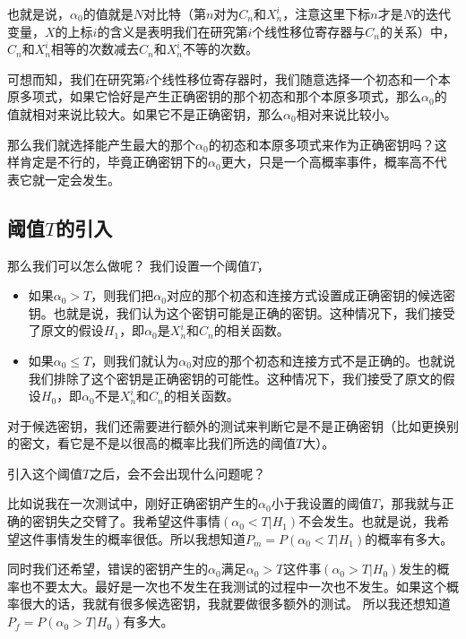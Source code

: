 \documentclass{article}
\begin{document}
也就是说，$\alpha_0$的值就是$N$对比特（第$n$对为$C_n$和$X_n^i$，注意这里下标$n$才是$N$的迭代变量，$X$的上标$i$的含义是表明我们在研究第$i$个线性移位寄存器与$C_n$的关系）中，$C_n$和$X_n^i$相等的次数减去$C_n$和$X_n^i$不等的次数。

可想而知，我们在研究第$i$个线性移位寄存器时，我们随意选择一个初态和一个本原多项式，如果它恰好是产生正确密钥的那个初态和那个本原多项式，那么$\alpha_0$的值就相对来说比较大。如果它不是正确密钥，那么$\alpha_0$相对来说比较小。

那么我们就选择能产生最大的那个$\alpha_0$的初态和本原多项式来作为正确密钥吗？这样肯定是不行的，毕竟正确密钥下的$\alpha_0$更大，只是一个高概率事件，概率高不代表它就一定会发生。
\subsection*{阈值$T$的引入}
那么我们可以怎么做呢？
我们设置一个阈值$T$，
\begin{itemize}
\item
如果$\alpha_0>T$，则我们把$\alpha_0$对应的那个初态和连接方式设置成正确密钥的候选密钥。也就是说，我们认为这个密钥可能是正确的密钥。这种情况下，我们接受了原文的假设$H_1$，即$\alpha_0$是$X_n^i$和$C_n$的相关函数。
\item
如果$\alpha_0 \leq T$，则我们就认为$\alpha_0$对应的那个初态和连接方式不是正确的。也就说我们排除了这个密钥是正确密钥的可能性。这种情况下，我们接受了原文的假设$H_0$，即$\alpha_0$不是$X_n^i$和$C_n$的相关函数。

\end{itemize}

对于候选密钥，我们还需要进行额外的测试来判断它是不是正确密钥（比如更换别的密文，看它是不是以很高的概率比我们所选的阈值$T$大）。


引入这个阈值$T$之后，会不会出现什么问题呢？

比如说我在一次测试中，刚好正确密钥产生的$\alpha_0$小于我设置的阈值$T$，那我就与正确的密钥失之交臂了。我希望这件事情$(\alpha_0 < T | H_1)$不会发生。也就是说，我希望这件事情发生的概率很低。所以我想知道$P_m=P(\alpha_0<T | H_1)$的概率有多大。

同时我们还希望，错误的密钥产生的$\alpha_0$满足$\alpha_0>T$这件事$(\alpha_0>T | H_0)$发生的概率也不要太大。最好是一次也不发生在我测试的过程中一次也不发生。如果这个概率很大的话，我就有很多候选密钥，我就要做很多额外的测试。
所以我还想知道$P_f=P(\alpha_0>T | H_0)$有多大。
\end{document}
